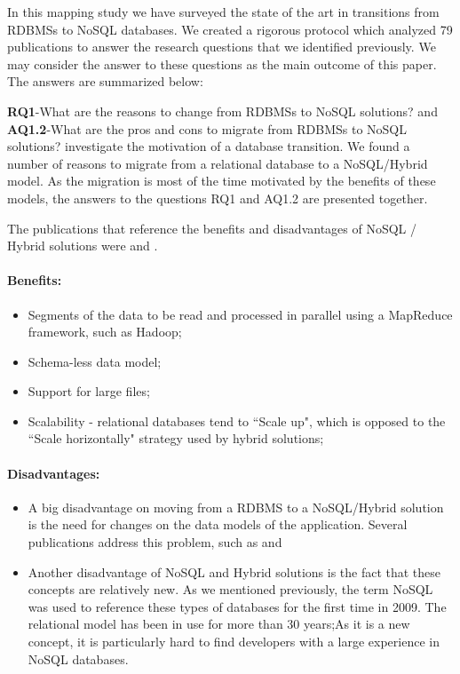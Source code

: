 \documentclass[a4paper]{IEEEtran}
\begin{document}
In this mapping study we have surveyed the state of the art in transitions from RDBMSs to NoSQL databases. We created a rigorous protocol which analyzed 79 publications to answer the research questions that we identified previously. We may consider the answer to these questions as the main outcome of this paper. The answers are summarized below:
\bigskip

\noindent\textbf{RQ1}-What are the reasons to change from RDBMSs to NoSQL solutions?  and \textbf{AQ1.2}-What are the pros and cons to migrate from RDBMSs to NoSQL solutions? investigate the motivation of a database transition. We found a number of reasons to migrate from a relational database to a NoSQL/Hybrid model. As the migration is most of the time motivated by the benefits of these models, the answers to the questions RQ1 and AQ1.2 are presented together. 

 The publications that reference the benefits and disadvantages of NoSQL / Hybrid solutions  were \cite{Schram:2012:MND:2384716.2384773} \cite{buazuartransition} and \cite{gomez2014building}.

\paragraph*{Benefits:} 
\begin{itemize}
  \item Segments of the data to be read and processed in parallel using a MapReduce framework, such as Hadoop;
  \item Schema-less data model;
  \item Support for large files;
  \item Scalability - relational databases tend to ``Scale up", which is opposed to the ``Scale horizontally" strategy used by hybrid solutions;
\end{itemize}

\paragraph*{Disadvantages:}
    \begin{itemize}
    \item A big disadvantage on moving from a RDBMS to a NoSQL/Hybrid solution is the need for changes on the data models of the application. Several publications address this problem, such as \cite{Schram:2012:MND:2384716.2384773} \cite{Cattell:2011:SSN:1978915.1978919} and \cite{Mohan:2013:HRI:2452376.2452378}
    \item Another disadvantage of NoSQL and Hybrid solutions is the fact that these concepts are relatively new. As we mentioned previously, the term NoSQL was used to reference these types of databases for the first time in 2009\cite{ericevans}. The relational model has been in use for more than 30 years;As it is a new concept, it is particularly hard to find developers with a large experience in NoSQL databases.
\end{itemize}
    
\end{document}

